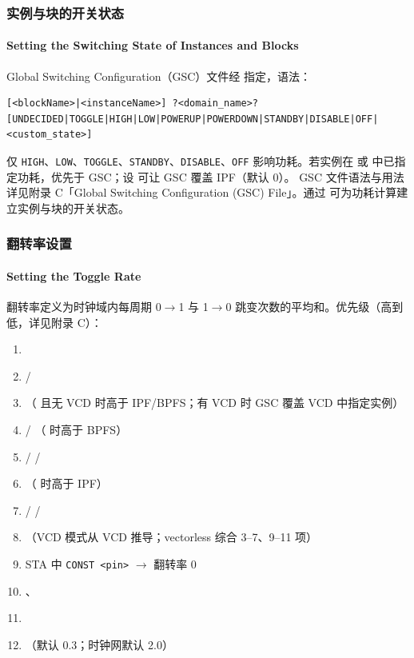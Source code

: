 \subsubsection{实例与块的开关状态}
\paragraph*{Setting the Switching State of Instances and Blocks}

Global Switching Configuration（GSC）文件经  指定，语法：
\begin{lstlisting}
[<blockName>|<instanceName>] ?<domain_name>?
[UNDECIDED|TOGGLE|HIGH|LOW|POWERUP|POWERDOWN|STANDBY|DISABLE|OFF|<custom_state>]
\end{lstlisting}

仅 \texttt{HIGH}、\texttt{LOW}、\texttt{TOGGLE}、\texttt{STANDBY}、\texttt{DISABLE}、\texttt{OFF} 影响功耗。若实例在  或  中已指定功耗，优先于 GSC；设  可让 GSC 覆盖 IPF（默认 0）。
GSC 文件语法与用法详见附录 C「Global Switching Configuration (GSC) File」。通过  可为功耗计算建立实例与块的开关状态。


\subsubsection{翻转率设置}
\paragraph*{Setting the Toggle Rate}

翻转率定义为时钟域内每周期 0$\rightarrow$1 与 1$\rightarrow$0 跳变次数的平均和。优先级（高到低，详见附录 C）：
\begin{enumerate}
  \item {}
  \item {} / 
  \item {}（ 且无 VCD 时高于 IPF/BPFS；有 VCD 时 GSC 覆盖 VCD 中指定实例）
  \item {} / （ 时高于 BPFS）
  \item {} /  / 
  \item {}（ 时高于 IPF）
  \item {} /  / 
  \item {}（VCD 模式从 VCD 推导；vectorless 综合 3--7、9--11 项）
  \item STA 中 \texttt{CONST <pin>} $\rightarrow$ 翻转率 0
  \item {}、
  \item {}
  \item {}（默认 0.3；时钟网默认 2.0）
\end{enumerate}

